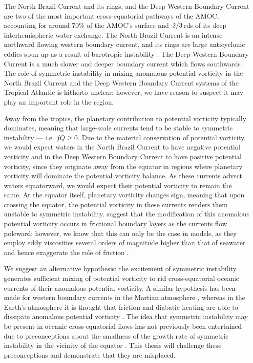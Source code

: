 
The North Brazil Current and its rings, and the Deep Western Boundary Current are two of the most important cross-equatorial pathways of the AMOC, accounting for around 70\% of the AMOC's surface \citep{Fratantoni2000} and $\flatfrac{2}{3}$rds of its deep \citep{Richardson1999, Bower2019} interhemispheric water exchange. The North Brazil Current is an intense northward flowing western boundary current, and its rings are large anticyclonic eddies spun up as a result of barotropic instability \citep{Johns1998,Castelao2011}. The Deep Western Boundary Current is a much slower and deeper boundary current which flows southwards \citep{Schott2005}. The role of symmetric instability in mixing anomalous potential vorticity in the North Brazil Current and the Deep Western Boundary Current systems of the Tropical Atlantic is hitherto unclear; however, we have reason to suspect it may play an important role in the region. 

Away from the tropics, the planetary contribution to potential vorticity typically dominates, meaning that large-scale currents tend to be stable to symmetric instability --- i.e. $fQ \geq 0$. Due to the material conservation of potential vorticity, we would expect waters in the North Brazil Current to have negative potential vorticity and in the Deep Western Boundary Current to have positive potential vorticity, since they originate away from the equator in regions where planetary vorticity will dominate the potential vorticity balance. As these currents advect waters equatorward, we would expect their potential vorticity to remain the same. At the equator itself, planetary vorticity changes sign, meaning that upon crossing the equator, the potential vorticity in these currents renders them unstable to symmetric instability. \citet{Edwards1998I, Edwards1998II} suggest that the modification of this anomalous potential vorticity occurs in frictional boundary layers as the currents flow poleward; however, we know that this can only be the case in models, as they employ eddy viscosities several orders of magnitude higher than that of seawater and hence exaggerate the role of friction \citep{Akuetevi2015}.

We suggest an alternative hypothesis: the excitement of symmetric instability generates sufficient mixing of potential vorticity to rid cross-equatorial oceanic currents of their anomalous potential vorticity. A similar hypothesis has been made for western boundary currents in the Martian atmosphere \citep{Joshi1994}, whereas in the Earth's atmosphere it is thought that friction and diabatic heating are able to dissipate anomalous potential vorticity \citep{Rodwell1995}. The idea that symmetric instability may be present in oceanic cross-equatorial flows has not previously been entertained due to preconceptions about the smallness of the growth rate of symmetric instability in the vicinity of the equator \citep{Edwards1998I, Haine1998}. This thesis will challenge these preconceptions and demonstrate that they are misplaced.

